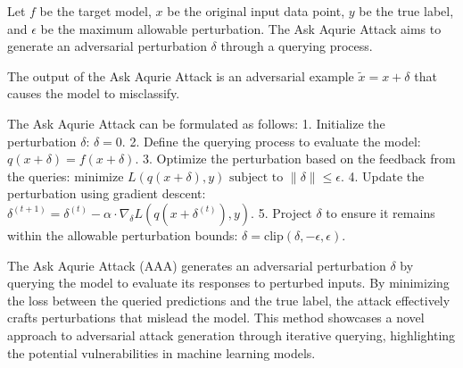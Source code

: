 Let \( f \) be the target model, \( x \) be the original input data point, \( y \) be the true label, and \( \epsilon \) be the maximum allowable perturbation. The Ask Aqurie Attack aims to generate an adversarial perturbation \( \delta \) through a querying process.

The output of the Ask Aqurie Attack is an adversarial example \( \tilde{x} = x + \delta \) that causes the model to misclassify.

The Ask Aqurie Attack can be formulated as follows:
1. Initialize the perturbation \( \delta \):
   $
   \delta = 0.
   $
2. Define the querying process to evaluate the model:
   $
   q(x + \delta) = f(x + \delta).
   $
3. Optimize the perturbation based on the feedback from the queries:
   $
   \text{minimize } L(q(x + \delta), y) \text{ subject to } \|\delta\| \leq \epsilon.
   $
4. Update the perturbation using gradient descent:
   $
   \delta^{(t+1)} = \delta^{(t)} - \alpha \cdot \nabla_{\delta} L(q(x + \delta^{(t)}), y).
   $
5. Project \( \delta \) to ensure it remains within the allowable perturbation bounds:
   $
   \delta = \text{clip}(\delta, -\epsilon, \epsilon).
   $

The Ask Aqurie Attack (AAA) generates an adversarial perturbation \( \delta \) by querying the model to evaluate its responses to perturbed inputs. By minimizing the loss between the queried predictions and the true label, the attack effectively crafts perturbations that mislead the model. This method showcases a novel approach to adversarial attack generation through iterative querying, highlighting the potential vulnerabilities in machine learning models.
